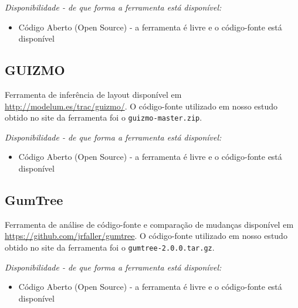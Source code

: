 \begin{description}

  \item {\it Disponibilidade - de que forma a ferramenta está disponível:}
    \begin{itemize}
      \item Código Aberto (Open Source) - a ferramenta é livre e o código-fonte está disponível
    \end{itemize}

\end{description}

\subsection{GUIZMO}

Ferramenta de inferência de layout disponível em
\url{http://modelum.es/trac/guizmo/}. O código-fonte
utilizado em nosso estudo obtido no site da ferramenta foi o
\texttt{guizmo-master.zip}.

\begin{description}

  \item {\it Disponibilidade - de que forma a ferramenta está disponível:}
    \begin{itemize}
      \item Código Aberto (Open Source) - a ferramenta é livre e o código-fonte está disponível
    \end{itemize}

\end{description}

\subsection{GumTree}

Ferramenta de análise de código-fonte e comparação de mudanças
disponível em \url{https://github.com/jrfaller/gumtree}. O
código-fonte utilizado em nosso estudo obtido no site da ferramenta foi o
\texttt{gumtree-2.0.0.tar.gz}.

\begin{description}

  \item {\it Disponibilidade - de que forma a ferramenta está disponível:}
    \begin{itemize}
      \item Código Aberto (Open Source) - a ferramenta é livre e o código-fonte está disponível
    \end{itemize}

\end{description}

